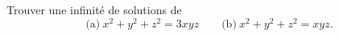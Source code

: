 Trouver une infinité de solutions de
\[ \text{(a)}\ x^2 + y^2 + z^2 = 3xyz\qquad \text{(b)}\ x^2 + y^2 + z^2 = xyz. \]
